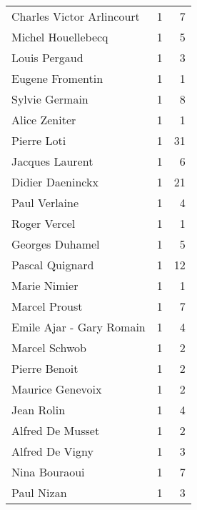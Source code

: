 \begin{xltabular}{\textwidth}{lrr}
           Charles Victor Arlincourt &          1 &                7 \\
                  Michel Houellebecq &          1 &                5 \\
                       Louis Pergaud &          1 &                3 \\
                    Eugene Fromentin &          1 &                1 \\
                      Sylvie Germain &          1 &                8 \\
                       Alice Zeniter &          1 &                1 \\
                         Pierre Loti &          1 &               31 \\
                     Jacques Laurent &          1 &                6 \\
                    Didier Daeninckx &          1 &               21 \\
                       Paul Verlaine &          1 &                4 \\
                        Roger Vercel &          1 &                1 \\
                     Georges Duhamel &          1 &                5 \\
                     Pascal Quignard &          1 &               12 \\
                        Marie Nimier &          1 &                1 \\
                       Marcel Proust &          1 &                7 \\
            Emile Ajar - Gary Romain &          1 &                4 \\
                       Marcel Schwob &          1 &                2 \\
                       Pierre Benoit &          1 &                2 \\
                    Maurice Genevoix &          1 &                2 \\
                          Jean Rolin &          1 &                4 \\
                    Alfred De Musset &          1 &                2 \\
                     Alfred De Vigny &          1 &                3 \\
                       Nina Bouraoui &          1 &                7 \\
                          Paul Nizan &          1 &                3 \\

\end{xltabular}
